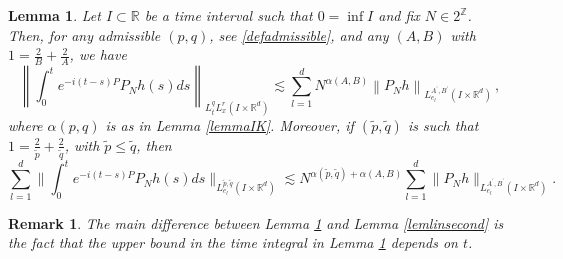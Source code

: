\documentclass[10pt,leqno]{amsart}
\newtheorem{lem}[thm]{Lemma}
\newtheorem{rmq}[thm]{Remark}
\newcommand{\R}{\mathbb{R}}
\numberwithin{equation}{section}
\newcommand{\Z}{\mathbb{Z}}
\begin{document}
\begin{lem}
\label{lemlin}
 Let $I\subset \R$ be a time interval such that $0=\inf I$ and fix $N\in 2^\Z$. Then, for any admissible $(p,q)$, see \eqref{defadmissible}, and any $(A, B)$ with $1= \frac{2}{B} +\frac{2}{A}$, we have
$$\left\|\int_0^t e^{-i(t-s) P} P_N h(s) ds\right\|_{L_t^q L_x^r (I\times \R^d )} \lesssim  \sum_{l=1}^d N^{\alpha (A,B)} \left\|P_N h\right\|_{L_{e_l}^{A^\prime ,B^\prime} (I\times \R^d )} \,,$$
where $\alpha(p, q)$ is as in Lemma \ref{lemmaIK}.
Moreover, if $(\tilde{p},\tilde{q}) $ is such that $1= \frac{2}{\tilde{p}} +\frac{2}{\tilde{q}}$, with $\tilde{p} \leq \tilde{q}$, then
$$ \sum_{l=1}^d\Big\|\int_0^t e^{-i(t-s) P} P_N h(s) ds \Big\|_{L_{e_l}^{\tilde{p},\tilde{q}} (I\times \R^d)}\lesssim 
N^{\alpha(\tilde{p},\tilde{q}) + \alpha (A,B)} \sum_{l=1}^d  \|P_N h\|_{L_{e_l}^{A^\prime ,B^\prime} (I\times \R^d )}. $$
\end{lem}
\begin{rmq}

\textnormal{
The main difference between 
 Lemma \ref{lemlin} and Lemma \ref{lemlinsecond} is the fact that the upper bound in the time integral in Lemma \ref{lemlin}   depends on $t$.
}
\end{rmq}
\end{document}
